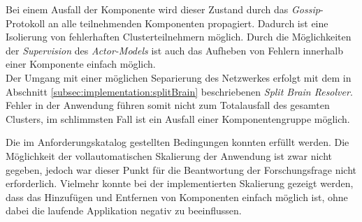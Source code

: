\begin{enumerate}
    Bei einem Ausfall der Komponente wird dieser Zustand durch das \textit{Gossip}-Protokoll an alle teilnehmenden Komponenten propagiert. Dadurch ist eine Isolierung von fehlerhaften Clusterteilnehmern möglich. Durch die Möglichkeiten der \textit{Supervision} des \textit{Actor-Models} ist auch das Aufheben von Fehlern innerhalb einer Komponente einfach möglich. \\
    Der Umgang mit einer möglichen Separierung des Netzwerkes erfolgt mit dem in Abschnitt \ref{subsec:implementation:splitBrain} beschriebenen \textit{Split Brain Resolver}. Fehler in der Anwendung führen somit nicht zum Totalausfall des gesamten Clusters, im schlimmsten Fall ist ein Ausfall einer Komponentengruppe möglich.
\end{enumerate}
Die im Anforderungskatalog gestellten Bedingungen konnten  erfüllt werden. Die Möglichkeit der vollautomatischen Skalierung der Anwendung ist zwar nicht gegeben, jedoch war dieser Punkt für die Beantwortung der Forschungsfrage nicht erforderlich. Vielmehr konnte bei der implementierten Skalierung gezeigt werden, dass das Hinzufügen und Entfernen von Komponenten einfach möglich ist, ohne dabei die laufende Applikation negativ zu beeinflussen. 

